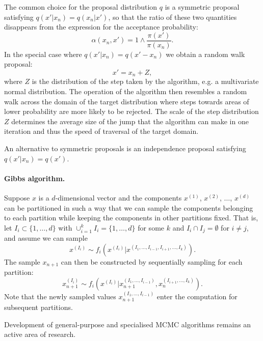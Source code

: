 \documentclass[11pt,a4paper]{report}
\begin{document}
The common choice for the proposal distribution $q$ is a symmetric proposal satisfying $q(x'|x_n) = q(x_n|x')$, so that the ratio of these two quantities disappears from the expression for the acceptance probability:
$$\alpha(x_n, x') = 1 \wedge \frac{\pi(x')}{\pi(x_n)}.$$
In the special case where $q(x'|x_n) = q(x' - x_n)$ we obtain a random walk proposal:
$$x' = x_n + Z,$$
where $Z$ is the distribution of the step taken by the algorithm, e.g. a multivariate normal distribution. The operation of the algorithm then resembles a random walk across the domain of the target distribution where steps towards areas of lower probability are more likely to be rejected. The scale of the step distribution $Z$ determines the average size of the jump that the algorithm can make in one iteration and thus the speed of traversal of the target domain.

An alternative to symmetric proposals is an independence proposal satisfying $q(x'|x_n) = q(x')$.


\paragraph{Gibbs algorithm.} Suppose $x$ is a $d$-dimensional vector and the components $x^{(1)}$, $x^{(2)}$, $\dots$, $x^{(d)}$ can be partitioned in such a way that we can sample the components belonging to each partition while keeping the components in other partitions fixed. That is, let $I_i \subset \{1, \dots, d\}$ with $\cup_{i=1}^k I_i = \{1, \dots, d\}$ for some $k$ and $I_i \cap I_j = \emptyset$ for $i \neq j$, and assume we can sample
$$x^{(I_i)} \sim f_i\left(x^{(I_i)} | x^{(I_1, \dots, I_{i-1}, I_{i+1}, \dots, I_k)}\right).$$
The sample $x_{n+1}$ can then be constructed by sequentially sampling for each partition:
$$x_{n+1}^{(I_i)} \sim f_i\left(x^{(I_i)} | x_{n+1}^{(I_1, \dots, I_{i-1})}, x_n^{(I_{i+1}, \dots, I_k)}\right).$$
Note that the newly sampled values $x_{n+1}^{(I_1, \dots, I_{i-1})}$ enter the computation for subsequent partitions.




Development of general-purpose and specialised MCMC algorithms remains an active area of research.
\end{document}
